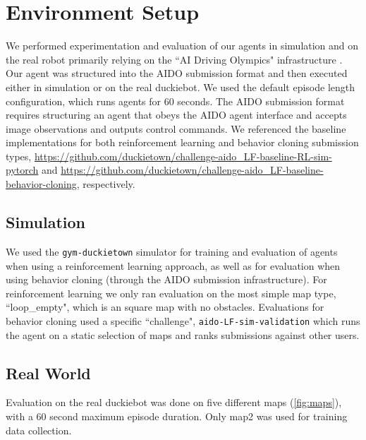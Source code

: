 \documentclass{article}
\begin{document}
\section{Environment Setup}

We performed experimentation and evaluation of our agents in simulation and on the real robot primarily relying on the ``AI Driving Olympics" infrastructure \cite{zilly2019ai}. Our agent was structured into the AIDO submission format and then executed either in simulation or on the real duckiebot. We used the default episode length configuration, which runs agents for 60 seconds. The AIDO submission format requires structuring an agent that obeys the AIDO agent interface and accepts image observations and outputs control commands. We referenced the baseline implementations for both reinforcement learning and behavior cloning submission types, \url{https://github.com/duckietown/challenge-aido_LF-baseline-RL-sim-pytorch} and \url{https://github.com/duckietown/challenge-aido_LF-baseline-behavior-cloning}, respectively.

\subsection{Simulation}

We used the \texttt{gym-duckietown} simulator \cite{gym_duckietown} for training and evaluation of agents when using a reinforcement learning approach, as well as for evaluation when using behavior cloning (through the AIDO submission infrastructure). For reinforcement learning we only ran evaluation on the most simple map type, ``loop\_empty", which is an square map with no obstacles. Evaluations for behavior cloning used a specific ``challenge", \texttt{aido-LF-sim-validation} which runs the agent on a static selection of maps and ranks submissions against other users.

\subsection{Real World}

Evaluation on the real duckiebot was done on five different maps (\ref{fig:maps}), with a 60 second maximum episode duration. Only map2 was used for training data collection.
\end{document}

